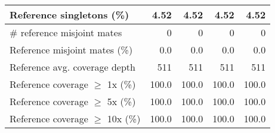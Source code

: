 \documentclass[12pt,a4paper]{article}
\begin{document}
\begin{table}[ht]
\begin{center}
\begin{tabular}{|l*{4}{|r}|}
Reference singletons (\%) & 4.52 & 4.52 & 4.52 & 4.52 \\ \hline
\# reference misjoint mates & 0 & 0 & 0 & 0 \\ \hline
Reference misjoint mates (\%) & 0.0 & 0.0 & 0.0 & 0.0 \\ \hline
Reference avg. coverage depth & 511 & 511 & 511 & 511 \\ \hline
Reference coverage $\geq$ 1x (\%) & 100.0 & 100.0 & 100.0 & 100.0 \\ \hline
Reference coverage $\geq$ 5x (\%) & 100.0 & 100.0 & 100.0 & 100.0 \\ \hline
Reference coverage $\geq$ 10x (\%) & 100.0 & 100.0 & 100.0 & 100.0 \\ \hline
\end{tabular}
\end{center}
\end{table}
\end{document}
